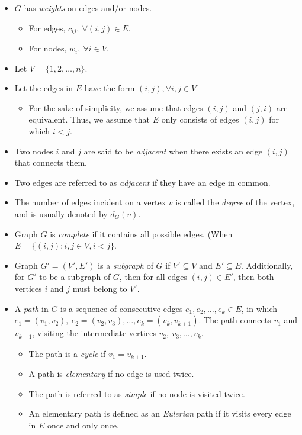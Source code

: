 \documentclass[12pt]{article}
\theoremstyle{definition}
\begin{document}
\begin{itemize}
	\item $G$ has \emph{weights} on edges and/or nodes. 
	\begin{itemize}
		\item For edges, $c_{ij}, \ \forall (i,j) \in E$. 
		\item For nodes, $w_i, \ \forall i \in V$.
	\end{itemize}
	\item Let $V= \{1,2, \dots, n\}$.
	\item Let the edges in $E$ have the form $(i,j), \forall i,j \in V$
	\begin{itemize}
		\item For the sake of simplicity, we assume that edges $(i,j)$ and $(j,i)$ are equivalent. Thus, we assume that $E$ only consists of edges $(i,j)$ for which $i<j$.
	\end{itemize}
	\item Two nodes $i$ and $j$ are said to be \emph{adjacent} when there exists an edge $(i,j)$ that connects them. 
	\item Two edges are referred to as \emph{adjacent} if they have an edge in common.
	\item The number of edges incident on a vertex $v$ is called the \emph{degree} of the vertex, and is usually denoted by $d_G(v)$. 
	\item Graph $G$ is \emph{complete}  if it contains all possible edges. (When $E = \{(i,j): i,j \in V, i < j\}$. 
	\item Graph $G' = (V', E')$ is a \emph{subgraph} of $G$ if $V' \subseteq V$ and $E' \subseteq E$. Additionally, for $G'$ to be a subgraph of $G$, then for all edges $(i,j) \in E'$, then both vertices $i$ and $j$ must belong to $V'$.
	\item A \emph{path} in $G$ is a sequence of consecutive edges $e_1, e_2, \dots, e_k \in E$, in which $e_1 = (v_1, v_2), \ e_2 = (v_2, v_3), \dots, e_k = (v_k, v_{k+1})$. The path connects $v_1$ and $v_{k+1}$, visiting the intermediate vertices $v_2, \ v_3, \dots, v_k$. 
	\begin{itemize}
		\item The path is a \emph{cycle} if $v_1 = v_{k+1}$. 
		\item A path is \emph{elementary} if no edge is used twice.
		\item The path is referred to as \emph{simple} if no node is visited twice.
		\item An elementary path is defined as an \emph{Eulerian} path if it visits every edge in $E$ once and only once. 

\end{itemize}
\end{itemize}
\end{document}
